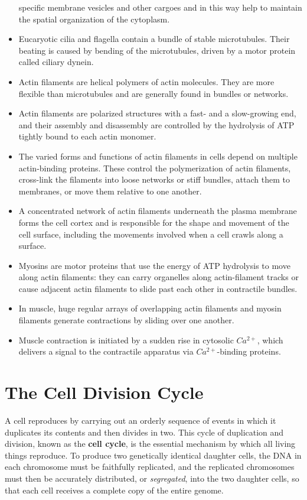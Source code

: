 \begin{itemize}
specific membrane vesicles and other cargoes and in this way help to
maintain the spatial organization of the cytoplasm.
\item Eucaryotic cilia and flagella contain a bundle of stable microtubules.
Their beating is caused by bending of the microtubules, driven by a
motor protein called ciliary dynein.
\item Actin filaments are helical polymers of actin molecules. They are
more flexible than microtubules and are generally found in bundles
or networks.
\item Actin filaments are polarized structures with a fast- and a slow-growing
end, and their assembly and disassembly are controlled by the
hydrolysis of ATP tightly bound to each actin monomer.
\item The varied forms and functions of actin filaments in cells depend on
multiple actin-binding proteins. These control the polymerization of
actin filaments, cross-link the filaments into loose networks or stiff
bundles, attach them to membranes, or move them relative to one
another.
\item A concentrated network of actin filaments underneath the plasma
membrane forms the cell cortex and is responsible for the shape and
movement of the cell surface, including the movements involved
when a cell crawls along a surface.
\item Myosins are motor proteins that use the energy of ATP hydrolysis to
move along actin filaments: they can carry organelles along actin-filament
tracks or cause adjacent actin filaments to slide past each
other in contractile bundles.
\item In muscle, huge regular arrays of overlapping actin filaments and
myosin filaments generate contractions by sliding over one another.
\item Muscle contraction is initiated by a sudden rise in cytosolic $Ca^{2+}$,
which delivers a signal to the contractile apparatus via $Ca^{2+}$-binding
proteins.
\end{itemize}

\chapter{The Cell Division Cycle}

A cell reproduces by carrying out an orderly sequence of events in which
it duplicates its contents and then divides in two. This cycle of duplication
and division, known as the \textbf{cell cycle}, is the essential mechanism by
which all living things reproduce. To produce two
genetically identical daughter cells, the DNA in each chromosome must
be faithfully replicated, and the replicated chromosomes must then be
accurately distributed, or \textit{segregated}, into the two daughter cells, so that
each cell receives a complete copy of the entire genome.

